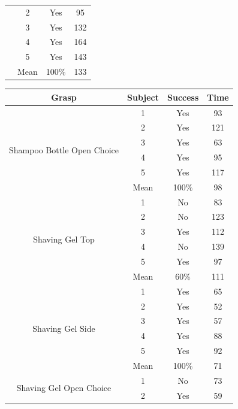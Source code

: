 \begin{table}[t]
\begin{minipage}[t]{0.5\columnwidth}
\begin{tabular}[t!]{ | c c c c | }
 &2 & Yes & 95 \\
 &3 & Yes & 132 \\
 &4 & Yes & 164 \\
 &5 & Yes & 143 \\ 
 & Mean & 100\% & 133\\\hline
 \end{tabular}
 \end{minipage}
 \hspace{.15\columnwidth}
 \begin{minipage}[!t]{.5\columnwidth}
 \begin{tabular}[t!]{ | c c c c | }
 \hline
 Grasp & Subject & Success & Time \\ \hline \hline
 \multirow{6}{*}{\begin{minipage}[t]{0.24\columnwidth}Shampoo Bottle Open Choice\end{minipage}} & 1 & Yes & 93 \\
 &2 & Yes & 121 \\
 &3 & Yes & 63 \\
 &4 & Yes & 95 \\
 &5 & Yes & 117 \\ 
 & Mean & 100\% & 98\\\hline 
 \multirow{6}{*}{\begin{minipage}[t]{0.24\columnwidth}Shaving Gel Top\end{minipage}} & 1 & No & 83 \\ 
 & 2 & No & 123 \\ 
 & 3 & Yes & 112\\
 & 4 & No & 139 \\
 & 5 & Yes & 97 \\ 
 & Mean & 60\% & 111\\\hline 
 \multirow{6}{*}{\begin{minipage}[t]{0.24\columnwidth}Shaving Gel Side\end{minipage}} & 1 & Yes & 65 \\
 &2 & Yes & 52 \\
 &3 & Yes & 57 \\
 &4 & Yes & 88 \\
 &5 & Yes & 92 \\ 
 & Mean & 100\% & 71\\\hline 
 \multirow{6}{*}{\begin{minipage}[t]{0.24\columnwidth}Shaving Gel Open Choice\end{minipage}} & 1 & No & 73 \\
 &2 & Yes & 59 \\

\end{tabular}
\end{minipage}
\end{table}

